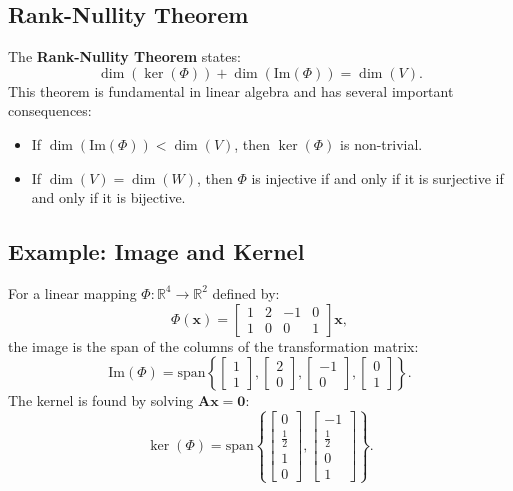 \subsection{Rank-Nullity Theorem}
The \textbf{Rank-Nullity Theorem} states:
\[
\dim(\ker(\Phi)) + \dim(\text{Im}(\Phi)) = \dim(V).
\]
This theorem is fundamental in linear algebra and has several important consequences:
\begin{itemize}
    \item If \(\dim(\text{Im}(\Phi)) < \dim(V)\), then \(\ker(\Phi)\) is non-trivial.
    \item If \(\dim(V) = \dim(W)\), then \(\Phi\) is injective if and only if it is surjective if and only if it is bijective.
\end{itemize}

\subsection{Example: Image and Kernel}
For a linear mapping \(\Phi: \mathbb{R}^4 \to \mathbb{R}^2\) defined by:
\[
\Phi(\mathbf{x}) = \begin{bmatrix} 1 & 2 & -1 & 0 \\ 1 & 0 & 0 & 1 \end{bmatrix} \mathbf{x},
\]
the image is the span of the columns of the transformation matrix:
\[
\text{Im}(\Phi) = \text{span}\left\{\begin{bmatrix} 1 \\ 1 \end{bmatrix}, \begin{bmatrix} 2 \\ 0 \end{bmatrix}, \begin{bmatrix} -1 \\ 0 \end{bmatrix}, \begin{bmatrix} 0 \\ 1 \end{bmatrix}\right\}.
\]
The kernel is found by solving \(\mathbf{A}\mathbf{x} = \mathbf{0}\):
\[
\ker(\Phi) = \text{span}\left\{\begin{bmatrix} 0 \\ \frac{1}{2} \\ 1 \\ 0 \end{bmatrix}, \begin{bmatrix} -1 \\ \frac{1}{2} \\ 0 \\ 1 \end{bmatrix}\right\}.
\]

